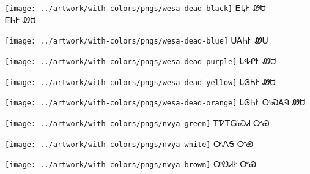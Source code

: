 \documentclass[avery5371]{flashcards}%
\begin{document}
    \begin{flashcard}{
        \texttt{[image: ../artwork/with-colors/pngs/wesa-dead-black]}
    }
        \Huge ᎬᎿᎨ ᏪᏌ\\ᎬᏂᎨ ᏪᏌ
    \end{flashcard}

    \begin{flashcard}{
        \texttt{[image: ../artwork/with-colors/pngs/wesa-dead-blue]}
    }
        \Huge ᏌᎪᏂᎨ ᏪᏌ
    \end{flashcard}

    \begin{flashcard}{
        \texttt{[image: ../artwork/with-colors/pngs/wesa-dead-purple]}
    }
        \Huge ᏓᎭᎵᎨ ᏪᏌ
    \end{flashcard}

    \begin{flashcard}{
        \texttt{[image: ../artwork/with-colors/pngs/wesa-dead-yellow]}
    }
        \Huge ᏓᎶᏂᎨ ᏪᏌ
    \end{flashcard}

    \begin{flashcard}{
        \texttt{[image: ../artwork/with-colors/pngs/wesa-dead-orange]}
    }
        \Huge ᏓᎶᏂᎨ ᎤᏍᎪᎸ ᏪᏌ
    \end{flashcard}


    \begin{flashcard}{
        \texttt{[image: ../artwork/with-colors/pngs/nvya-green]}
    }
        \Huge ᎢᏤᎢᏳᏍᏗ ᏅᏯ
    \end{flashcard}

    \begin{flashcard}{
        \texttt{[image: ../artwork/with-colors/pngs/nvya-white]}
    }
        \Huge ᎤᏁᎦ ᏅᏯ
    \end{flashcard}

    \begin{flashcard}{
        \texttt{[image: ../artwork/with-colors/pngs/nvya-brown]}
    }
        \Huge ᎤᏬᏗᎨ ᏅᏯ
    \end{flashcard}
\end{document}
